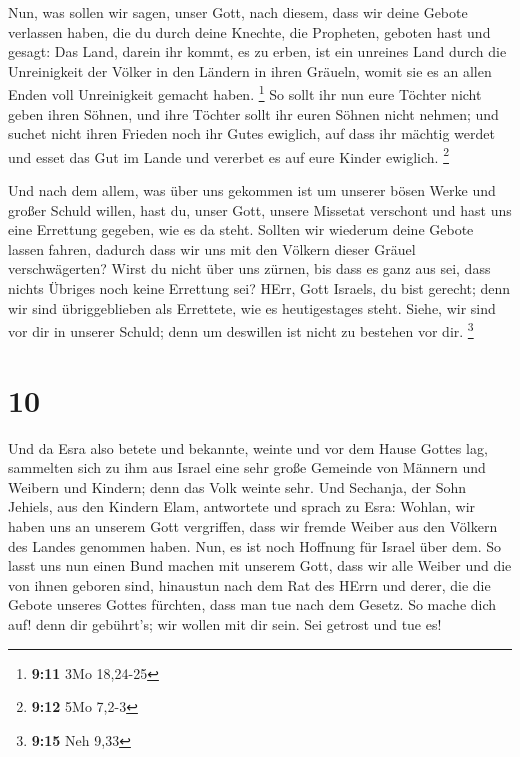  Nun, was sollen wir sagen, unser Gott, nach diesem, dass
wir deine Gebote verlassen haben,  die du durch deine
Knechte, die Propheten, geboten hast und gesagt: Das Land, darein ihr
kommt, es zu erben, ist ein unreines Land durch die Unreinigkeit der
Völker in den Ländern in ihren Gräueln, womit sie es an allen Enden voll
Unreinigkeit gemacht haben. \footnote{\textbf{9:11} 3Mo 18,24-25}
 So sollt ihr nun eure Töchter nicht geben ihren Söhnen,
und ihre Töchter sollt ihr euren Söhnen nicht nehmen; und suchet nicht
ihren Frieden noch ihr Gutes ewiglich, auf dass ihr mächtig werdet und
esset das Gut im Lande und vererbet es auf eure Kinder ewiglich.
\footnote{\textbf{9:12} 5Mo 7,2-3}

 Und nach dem allem, was über uns gekommen ist um unserer
bösen Werke und großer Schuld willen, hast du, unser Gott, unsere
Missetat verschont und hast uns eine Errettung gegeben, wie es da steht.
 Sollten wir wiederum deine Gebote lassen fahren, dadurch
dass wir uns mit den Völkern dieser Gräuel verschwägerten? Wirst du
nicht über uns zürnen, bis dass es ganz aus sei, dass nichts Übriges
noch keine Errettung sei?  HErr, Gott Israels, du bist
gerecht; denn wir sind übriggeblieben als Errettete, wie es
heutigestages steht. Siehe, wir sind vor dir in unserer Schuld; denn um
deswillen ist nicht zu bestehen vor dir. \footnote{\textbf{9:15} Neh
  9,33}

\hypertarget{section-3}{%
\section{10}\label{section-3}}

 Und da Esra also betete und bekannte, weinte und vor dem
Hause Gottes lag, sammelten sich zu ihm aus Israel eine sehr große
Gemeinde von Männern und Weibern und Kindern; denn das Volk weinte sehr.
 Und Sechanja, der Sohn Jehiels, aus den Kindern Elam,
antwortete und sprach zu Esra: Wohlan, wir haben uns an unserem Gott
vergriffen, dass wir fremde Weiber aus den Völkern des Landes genommen
haben. Nun, es ist noch Hoffnung für Israel über dem.  So
lasst uns nun einen Bund machen mit unserem Gott, dass wir alle Weiber
und die von ihnen geboren sind, hinaustun nach dem Rat des HErrn und
derer, die die Gebote unseres Gottes fürchten, dass man tue nach dem
Gesetz.  So mache dich auf! denn dir gebührt's; wir wollen
mit dir sein. Sei getrost und tue es!

